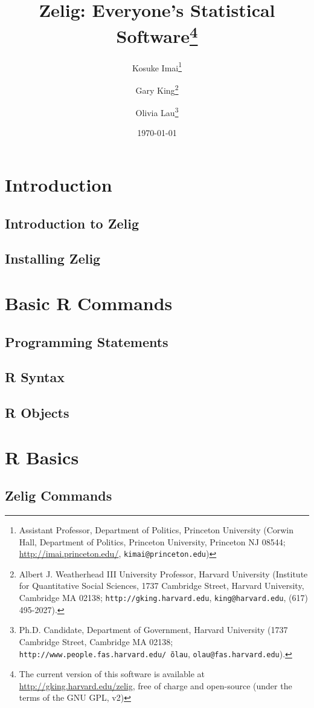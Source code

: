 \documentclass{book}
\title{
  Zelig: Everyone's Statistical Software\thanks{The current version of
  this software is available at 
  \url{http://gking.harvard.edu/zelig}, free of charge and open-source
  (under the terms of the GNU GPL, v2)}
}
\author{  Kosuke Imai\thanks{Assistant Professor, Department of Politics,
  Princeton University
  (Corwin Hall, Department of Politics, Princeton University, Princeton NJ 08544;
  \url{http://imai.princeton.edu/}, \texttt{kimai@princeton.edu})}
  \and
  Gary King\thanks{Albert J. Weatherhead III University Professor, Harvard
  University (Institute for Quantitative Social Sciences, 1737 Cambridge 
  Street, Harvard University, Cambridge MA 02138;
  \texttt{http://gking.harvard.edu}, \texttt{king@harvard.edu},
  (617) 495-2027).}
  \and
  Olivia Lau\thanks{Ph.D. Candidate, Department of Government, Harvard
  University (1737 Cambridge Street, Cambridge MA 02138;
  \texttt{http://www.people.fas.harvard.edu/\~\,olau},
  \texttt{olau@fas.harvard.edu}).}
}
\date{\today
}
\begin{document}
\maketitle
\tableofcontents

\part{Introduction}
\label{part:Introduction}

\chapter[Introduction]{Introduction to Zelig}
\label{chapter:Intro}


\chapter[Installing Zelig]{Installing Zelig}
\label{chapter:Install}


\part{Basic R Commands}
\label{part:Basic R Commands}

\chapter[Programming Statements]{Programming Statements}
\label{chapter:Programmingstatements}


\chapter[R Syntax]{R Syntax}
\label{chapter:Syntax}


\chapter[R Objects]{R Objects}
\label{chapter:Robjects}


\part{R Basics}
\label{part:R Basics}

\chapter[Zelig Commands]{Zelig Commands}
\label{chapter:Zcommands}

\end{document}
